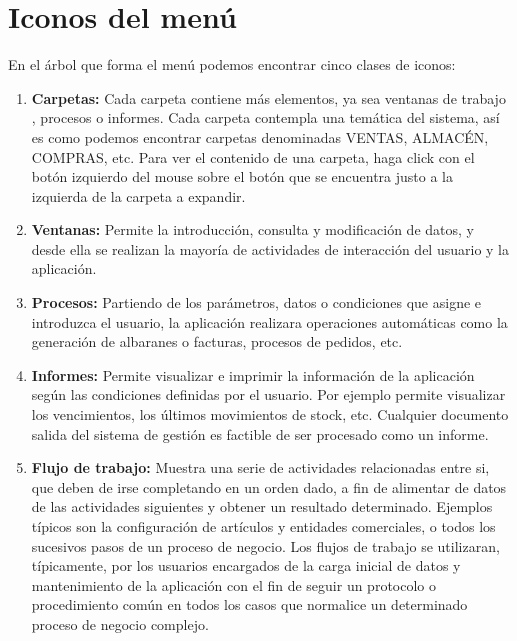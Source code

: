 \documentclass[letterpaper,10pt,spanish]{sphinxmanual}
\begin{document}
\section{Iconos del menú}
\label{estructura:iconos-del-menu}
En el árbol que forma el menú podemos encontrar cinco clases de iconos:
\begin{enumerate}
\item {} 
\textbf{Carpetas:} Cada carpeta contiene más elementos, ya sea ventanas de trabajo , procesos o informes. Cada carpeta contempla una temática del sistema, así es como podemos encontrar carpetas denominadas VENTAS, ALMACÉN, COMPRAS, etc. Para ver el contenido de una carpeta, haga click con el botón izquierdo del mouse sobre el botón que se encuentra justo a la izquierda de la carpeta a expandir.

\item {} 
\textbf{Ventanas:} Permite la introducción, consulta y modificación de datos, y desde ella se realizan la mayoría de actividades de interacción del usuario y la aplicación.

\item {} 
\textbf{Procesos:} Partiendo de los parámetros, datos o condiciones que asigne e introduzca el usuario, la aplicación realizara operaciones automáticas como la generación de albaranes o facturas, procesos de pedidos, etc.

\item {} 
\textbf{Informes:} Permite visualizar e imprimir la información de la aplicación según las condiciones definidas por el usuario. Por ejemplo permite visualizar los vencimientos, los últimos movimientos de stock, etc. Cualquier documento salida del sistema de gestión es factible de ser procesado como un informe.

\item {} 
\textbf{Flujo de trabajo:} Muestra una serie de actividades relacionadas entre si, que deben de irse completando en un orden dado, a fin de alimentar de datos de las actividades siguientes y obtener un resultado determinado. Ejemplos típicos son la configuración de artículos y entidades comerciales, o todos los sucesivos pasos de un proceso de negocio. Los flujos de trabajo se utilizaran, típicamente, por los usuarios encargados de la carga inicial de datos y mantenimiento de la aplicación con el fin de seguir un protocolo o procedimiento común en todos los casos que normalice un determinado proceso de negocio complejo.

\end{enumerate}
\end{document}
